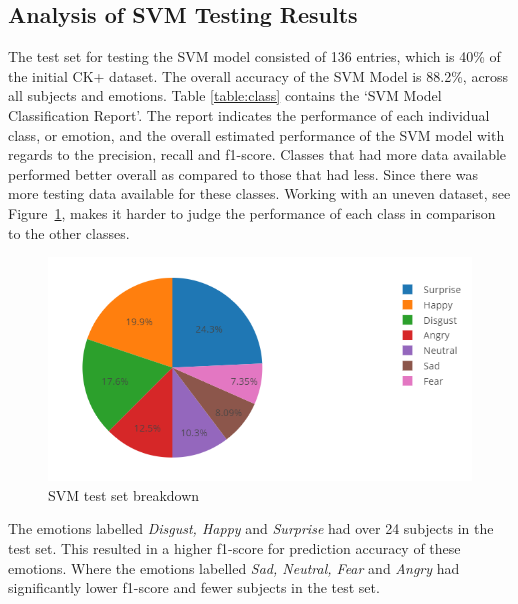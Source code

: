 \subsection{Analysis of SVM Testing Results}\label{sec:svm}
The test set for testing the SVM model consisted of 136 entries, which is 40\% of the initial CK+ dataset. The overall accuracy of the SVM Model is 88.2\%, across all subjects and emotions. Table \ref{table:class} contains the `SVM Model Classification Report'. The report indicates the performance of each individual class, or emotion, and the overall estimated performance of the SVM model with regards to the precision, recall and f1-score. Classes that had more data available performed better overall as compared to those that had less. Since there was more testing data available for these classes. Working with an uneven dataset, see Figure~\ref{fig:pie}, makes it harder to judge the performance of each class in comparison to the other classes. 
\begin{figure}[H]
  \centering
  \includegraphics[scale=1.0]{pie}
  \caption{SVM test set breakdown}
  \label{fig:pie}
\end{figure} 
The emotions labelled \textit{Disgust, Happy} and \textit{Surprise} had over 24 subjects in the test set. This resulted in a higher f1-score for prediction accuracy of these emotions. Where the emotions labelled \textit{Sad, Neutral, Fear} and \textit{Angry} had significantly lower f1-score and fewer subjects in the test set. 
